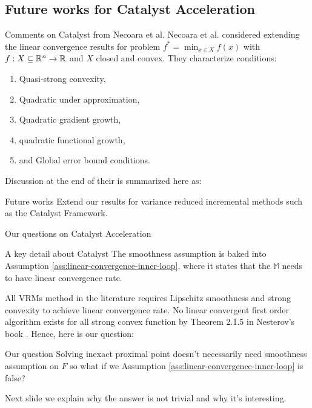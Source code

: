 \documentclass[11pt]{beamer}
\theoremstyle{definition}
\begin{document}
    \subsection{Future works for Catalyst Acceleration}
        \begin{frame}{Comments on Catalyst from Necoara et al. }
            Necoara et al. \cite{necoara_linear_2019} considered extending the linear convergence results for problem $f^* = \min_{x \in X} f(x)$ with $f: X \subseteq \mathbb R^n \rightarrow \mathbb R$ and $X$ closed and convex.
            They characterize conditions: 
            \begin{enumerate}
                \item Quasi-strong convexity, 
                \item Quadratic under approximation, 
                \item Quadratic gradient growth,
                \item quadratic functional growth, 
                \item and Global error bound conditions. 
            \end{enumerate}
            Discussion at the end of their is summarized here as: 
            \begin{block}{Future works}
                Extend our results for variance reduced incremental methods such as the Catalyst Framework. 
            \end{block}
            
        \end{frame}
        \begin{frame}{Our questions on Catalyst Acceleration}
            \begin{block}{A key detail about Catalyst}
                The smoothness assumption is baked into Assumption \ref{ass:linear-convergence-inner-loop}, where it states that the $\mathbb M$ needs to have linear convergence rate. 
            \end{block}
            All VRMs method in the literature requires Lipschitz smoothness and strong convexity to achieve linear convergence rate. 
            No linear convergent first order algorithm exists for all strong convex function by Theorem 2.1.5 in Nesterov's book \cite{nesterov_lectures_2018}. 
            Hence, here is our question: 
            \begin{alertblock}{Our question}
                Solving inexact proximal point doesn't necessarily need smoothness assumption on $F$ so what if we Assumption \ref{ass:linear-convergence-inner-loop} is false? 
            \end{alertblock}
            Next slide we explain why the answer is not trivial and why it's interesting. 
        \end{frame}
\end{document}
